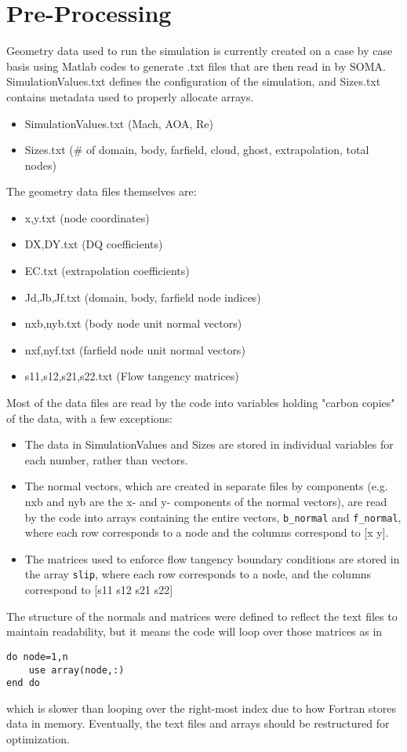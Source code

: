 \documentclass[12pt]{article}
\begin{document}
    \section{Pre-Processing}
        Geometry data used to run the simulation is currently created on a case by case basis using Matlab codes to generate .txt files that are then read in by SOMA. SimulationValues.txt defines the configuration of the simulation, and Sizes.txt contains metadata used to properly allocate arrays.
        \begin{itemize}
            \item SimulationValues.txt (Mach, AOA, Re)
            \item Sizes.txt (\# of domain, body, farfield, cloud, ghost, extrapolation, total nodes)
        \end{itemize}
        The geometry data files themselves are:
        \begin{itemize}
            \item x,y.txt (node coordinates)
            \item DX,DY.txt (DQ coefficients)
            \item EC.txt (extrapolation coefficients)
            \item Jd,Jb,Jf.txt (domain, body, farfield node indices)
            \item nxb,nyb.txt (body node unit normal vectors)
            \item nxf,nyf.txt (farfield node unit normal vectors)
            \item s11,s12,s21,s22.txt (Flow tangency matrices)
        \end{itemize}

        Most of the data files are read by the code into variables holding "carbon copies" of the data, with a few exceptions:
        \begin{itemize}
            \item The data in SimulationValues and Sizes are stored in individual variables for each number, rather than vectors.
            \item The normal vectors, which are created in separate files by components (e.g. nxb and nyb are the x- and y- components of the normal vectors), are read by the code into arrays containing the entire vectors, \texttt{b\_normal} and \texttt{f\_normal}, where each row corresponds to a node and the columns correspond to [x y].
            \item The matrices used to enforce flow tangency boundary conditions are stored in the array \texttt{slip}, where each row corresponds to a node, and the columns correspond to [s11 s12 s21 s22]
        \end{itemize}
        The structure of the normals and matrices were defined to reflect the text files to maintain readability, but it means the code will loop over those matrices as in
        \begin{verbatim}
do node=1,n
    use array(node,:)
end do
        \end{verbatim}
        which is slower than looping over the right-most index due to how Fortran stores data in memory. Eventually, the text files and arrays should be restructured for optimization.
\end{document}
